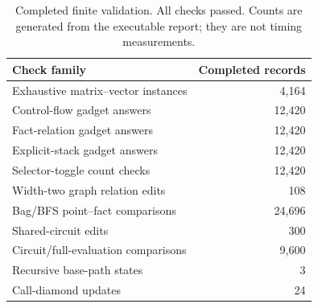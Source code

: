 \begin{table}[t]
\centering
\caption{Completed finite validation. All checks passed. Counts are
generated from the executable report; they are not timing measurements.}
\label{tab:validation}
\begin{tabular}{lr}
\toprule
Check family & Completed records\\
\midrule
Exhaustive matrix--vector instances & 4,164\\
Control-flow gadget answers & 12,420\\
Fact-relation gadget answers & 12,420\\
Explicit-stack gadget answers & 12,420\\
Selector-toggle count checks & 12,420\\
Width-two graph relation edits & 108\\
Bag/BFS point--fact comparisons & 24,696\\
Shared-circuit edits & 300\\
Circuit/full-evaluation comparisons & 9,600\\
Recursive base-path states & 3\\
Call-diamond updates & 24\\
\bottomrule
\end{tabular}
\end{table}
